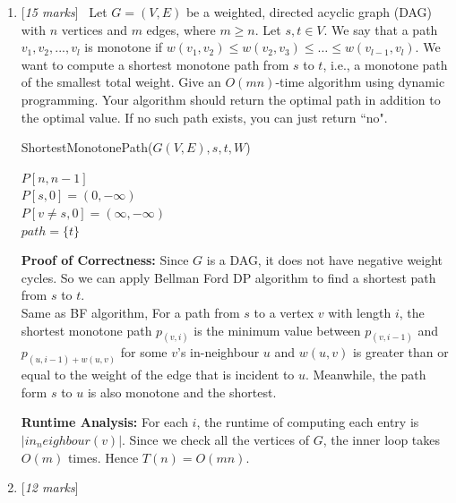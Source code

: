 \documentclass[11pt]{article}
\newcommand{\Q}[1]{\medskip\item {[{\em #1 marks\/}]}\ }
\begin{document}
\begin{enumerate}

\Q{15}  Let $G = (V,E)$ be a weighted, directed acyclic graph (DAG) with $n$ vertices and $m$ edges, where $m \ge n$. Let $s,t \in V$. We say that a path $v_1,v_2,...,v_l$ is monotone if $w(v_1,v_2) \le w(v_2,v_3) \le \ldots \le w(v_{l-1},v_l)$. We want to compute a shortest monotone path from $s$ to $t$, i.e., a monotone path of the smallest total weight. Give an $O(mn)$-time algorithm using dynamic programming. Your algorithm should return the optimal path in addition to the optimal value. If no such path exists, you can just return ``no". 

\begin{algorithm} [h]
	\caption{ShortestMonotonePath($G(V, E), s, t, W$)}
	$P[n, n - 1]$\\
	$P[s, 0] = (0, - \infty)$\\
	$P[v \neq s, 0] = (\infty, - \infty)$\\
	$path = \{ t \}$\\
\end{algorithm}

\textbf{Proof of Correctness:} Since $G$ is a DAG, it does not have negative weight cycles. So we can apply 
Bellman Ford DP algorithm to find a shortest path from $s$ to $t$.\\
Same as BF algorithm, For a path from $s$ to a vertex $v$ with length $i$, the shortest monotone path 
$p_{(v, i)}$ is the minimum value between $p_{(v, i - 1)}$ and $p_{(u, i - 1) + w(u, v)}$ for some $v$'s 
in-neighbour $u$ and $w(u, v)$ is greater than or equal to the weight of the edge that is incident to $u$. 
Meanwhile, the path form $s$ to $u$ is also monotone and the shortest.

\textbf{Runtime Analysis:} For each $i$, the runtime of computing each entry is $|in_neighbour(v)|$. Since we 
check all the vertices of $G$, the inner loop takes $O(m)$ times. Hence $T(n) = O(m n)$.
\newpage
\Q{12}

\end{enumerate}
\end{document}
